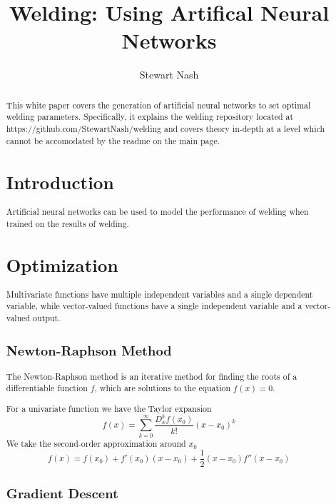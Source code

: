 \documentclass[11pt]{article}
\begin{document}
\title{Welding: Using Artifical Neural Networks}
\author{Stewart Nash}

\maketitle

\begin{abstract}
  This white paper covers the generation of artificial neural networks to set optimal welding parameters. Specifically, it explains the welding repository located at https://github.com/StewartNash/welding and covers theory in-depth at a level which cannot be accomodated by the readme on the main page.

\section{Introduction}
  Artificial neural networks can be used to model the performance of welding when trained on the results of welding.
  
\section{Optimization}

Multivariate functions have multiple independent variables and a single dependent variable, while vector-valued functions have a single independent variable and a vector-valued output. 

\subsection{Newton-Raphson Method}

The Newton-Raphson method is an iterative method for finding the roots of a differentiable function $f$, which are solutions to the equation $f(x)=0$.

For a univariate function we have the Taylor expansion
\begin{equation}
	f(x)=\sum_{k=0}^\infty{\frac{D_x^kf(x_0)}{k!}(x-x_0)^k}
\end{equation}
We take the second-order approximation around $x_0$
\begin{equation}
	f(x)=f(x_0)+f'(x_0)(x-x_0)+\frac{1}{2}(x-x_0)f''(x-x_0)
\end{equation}

\subsection{Gradient Descent}


\end{abstract}
\end{document}
